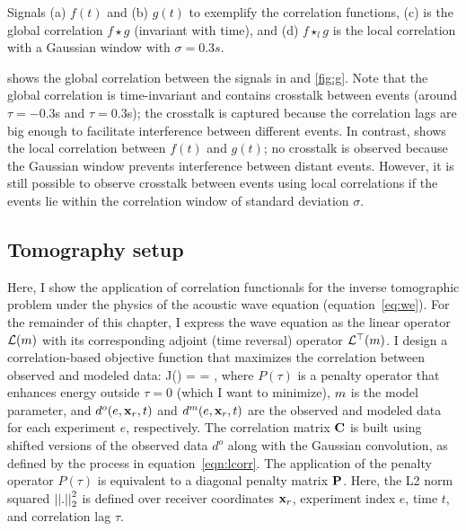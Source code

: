  {Signals
(a) $f(t)$ and (b) $g(t)$ to exemplify the correlation functions, (c) is the
global correlation $f\star g$ (invariant with time), and (d) $f\star_l g$ is
the local correlation with a Gaussian window with $\sigma=0.3s$.}





 shows the global correlation between the signals in  and
\ref{fig:g}. Note that the global correlation is time-invariant and contains
crosstalk between events (around $\tau=-0.3$s and $\tau=0.3$s); the crosstalk is
captured because the correlation lags are big enough to facilitate interference
between different events. In contrast,  shows the local correlation
between $f(t)$ and $g(t)$; no crosstalk is observed because the Gaussian
window prevents interference between distant events. However, it 
is still possible to observe crosstalk between events using local correlations if the events
lie within the correlation window of standard deviation $\sigma$.

\subsection{Tomography setup}

Here, I  show the application of correlation functionals for the 
inverse tomographic problem under the physics of the acoustic wave equation (equation~\ref{eq:we}).
 For the remainder of this chapter, I 
express the wave equation as the linear operator ${\mathcal{L}}(m)$ with its corresponding
adjoint (time reversal) operator ${\mathcal{L}}^\top(m)$.
 I design a correlation-based objective
function that maximizes the correlation between observed and modeled data:
\beq
  J(\m) = 
           {}=
          ,
  \label{eqn:of}
\eeq
where $P(\tau)$ is a penalty operator that enhances energy outside $\tau=0$
(which I want to minimize), $m$ is the model parameter, and $d^o(e,{\bf x}_r,t)$
and $d^m(e,{\bf x}_r,t)$ are the observed and modeled data for each experiment $e$,
respectively. The correlation matrix $\bf C$ is built using shifted versions
of the observed data $d^o$ along with the Gaussian convolution, as defined
by the process in equation~\ref{eqn:lcorr}. The application of the penalty
operator $P(\tau)$ is equivalent to a diagonal penalty matrix $\bf P$. Here,
the L2 norm squared $\left|\left|.\right|\right|^{2}_{2}$ is defined over receiver coordinates ${\bf x}_r$,
experiment index $e$, time $t$, and correlation lag $\tau$.

